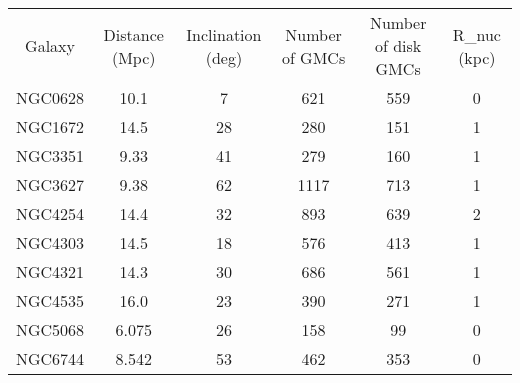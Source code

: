 \begin{table}
\begin{tabular}{cccccc}
Galaxy & Distance (Mpc) & Inclination (deg) & Number of GMCs & Number of disk GMCs & R_nuc (kpc) \\
NGC0628 & 10.1 & 7 & 621 & 559 & 0 \\
NGC1672 & 14.5 & 28 & 280 & 151 & 1 \\
NGC3351 & 9.33 & 41 & 279 & 160 & 1 \\
NGC3627 & 9.38 & 62 & 1117 & 713 & 1 \\
NGC4254 & 14.4 & 32 & 893 & 639 & 2 \\
NGC4303 & 14.5 & 18 & 576 & 413 & 1 \\
NGC4321 & 14.3 & 30 & 686 & 561 & 1 \\
NGC4535 & 16.0 & 23 & 390 & 271 & 1 \\
NGC5068 & 6.075 & 26 & 158 & 99 & 0 \\
NGC6744 & 8.542 & 53 & 462 & 353 & 0 \\
\end{tabular}
\end{table}
